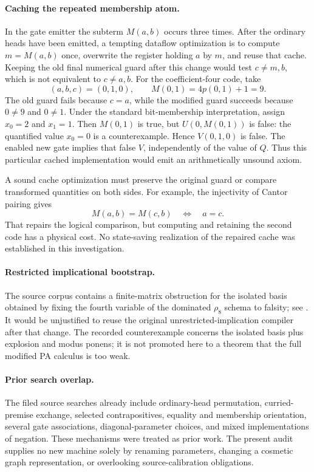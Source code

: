 \paragraph{Caching the repeated membership atom.}
In the gate emitter the subterm $M(a,b)$ occurs three times.  After the
ordinary heads have been emitted, a tempting dataflow optimization is to
compute $m=M(a,b)$ once, overwrite the register holding $a$ by $m$, and
reuse that cache.  Keeping the old final numerical guard after this change
would test $c\ne m,b$, which is not equivalent to $c\ne a,b$.
For the coefficient-four code, take
\[
 (a,b,c)=(0,1,0),\qquad M(0,1)=4p(0,1)+1=9.
\]
The old guard fails because $c=a$, while the modified guard succeeds
because $0\ne9$ and $0\ne1$.  Under the standard bit-membership
interpretation, assign $x_0=2$ and $x_1=1$.  Then $M(0,1)$ is true,
but $U(0,M(0,1))$ is false: the quantified value $x_0=0$ is a
counterexample.  Hence $V(0,1,0)$ is false.  The enabled new gate implies
that false $V$, independently of the value of $Q$.  Thus this particular
cached implementation would emit an arithmetically unsound axiom.

A sound cache optimization must preserve the original guard or compare
transformed quantities on both sides.  For example, the injectivity of
Cantor pairing gives
\[
 M(a,b)=M(c,b)\quad\Longleftrightarrow\quad a=c.
\]
That repairs the logical comparison, but computing and retaining the
second code has a physical cost.  No state-saving realization of the
repaired cache was established in this investigation.

\paragraph{Restricted implicational bootstrap.}
The source corpus contains a finite-matrix obstruction for the isolated
basis obtained by fixing the fourth variable of the dominated
$\rho_8$ schema to falsity; see
.
It would be unjustified to reuse the original unrestricted-implication
compiler after that change.  The recorded counterexample concerns the
isolated basis plus explosion and modus ponens; it is not promoted here
to a theorem that the full modified PA calculus is too weak.

\paragraph{Prior search overlap.}
The filed source searches already include ordinary-head permutation,
curried-premise exchange, selected contrapositives, equality and membership
orientation, several gate associations, diagonal-parameter choices, and
mixed implementations of negation.  These mechanisms were treated as
prior work.  The present audit supplies no new machine solely by renaming
parameters, changing a cosmetic graph representation, or overlooking
source-calibration obligations.

